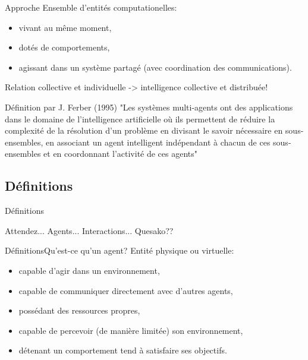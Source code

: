 \documentclass[t, 10pt]{beamer}
\begin{document}
	\begin{frame}[c]{Approche}
		\newline
		Ensemble d'entités computationelles:
		\begin{itemize}
		\item{vivant au même moment,}
		\item{dotés de comportements,}
		\item{agissant dans un système partagé (avec coordination des communications).}
		\end{itemize}
		Relation collective et individuelle -> intelligence collective et distribuée!
		\pause
		\begin{block}{Définition par J. Ferber (1995)}
		"Les systèmes multi-agents ont des applications dans le domaine de l'intelligence artificielle où ils permettent de réduire la complexité de la résolution d'un problème en divisant le savoir nécessaire en sous-ensembles, en associant un agent intelligent indépendant à chacun de ces sous-ensembles et en coordonnant l'activité de ces agents"
		\end{block}
	\end{frame}
	
	\subsection{Définitions}
	
	\begin{frame}[c]{Définitions}
		\begin{alertblock}{Attendez...}
			Agents... Interactions... Quesako??
		\end{alertblock}
	\end{frame}
	
	\begin{frame}[c]{Définitions}{Qu'est-ce qu'un agent?}
		Entité physique ou virtuelle: 
		\begin{itemize}
			\item{capable d’agir dans un environnement,}
			\item{capable de communiquer directement avec d’autres agents,}
			\item{possédant des ressources propres,}
			\item{capable de percevoir (de manière limitée) son environnement,}
			\item{détenant un comportement tend à satisfaire ses objectifs.}
		\end{itemize}
	\end{frame}
	
\end{document}
